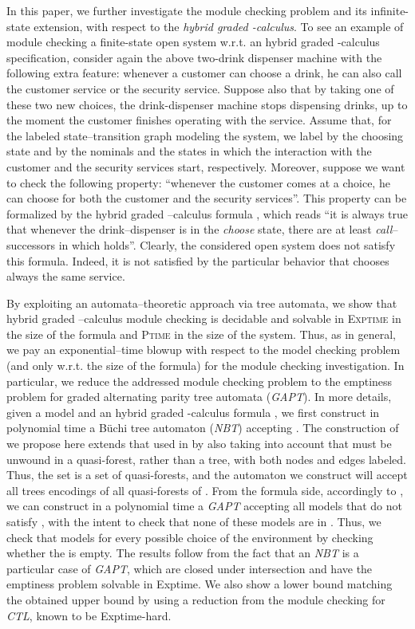 \documentclass{LMCS}
\theoremstyle{plain}
\def \CTL           {\emph{CTL}\xspace}
\def \EXP           {{\sc Exptime}\xspace}
\def \EXPTIME       {\textsc{Exptime}\xspace}
\def \GAPT          {\emph{GAPT}\xspace}
\def \NBT           {\emph{NBT}\xspace}
\def \PTIME         {\textsc{Ptime}\xspace}
\begin{document}
In this paper, we further investigate the module checking problem and its
infinite-state extension, with respect to the \emph{hybrid graded
-calculus}. To see an example of module checking a finite-state open
system w.r.t. an hybrid graded -calculus specification, consider again the
above two-drink dispenser machine with the following extra feature: whenever a
customer can choose a drink, he can also call the customer service or the
security service. Suppose also that by taking one of these two new choices, the
drink-dispenser machine stops dispensing drinks, up to the moment the customer
finishes operating with the service. Assume that, for the labeled
state--transition graph modeling the system, we label by  the
choosing state and by the nominals  and  the states in which the
interaction with the customer and the security services start, respectively.
Moreover, suppose we want to check the following property: ``whenever the
customer comes at a choice, he can choose for both the customer and the
security services''. This property can be formalized by the hybrid graded
--calculus formula , which reads ``it is always true that whenever the
drink--dispenser is in the \emph{choose} state, there are at least 
\emph{call}--successors in which  holds''. Clearly, the
considered open system does not satisfy this formula. Indeed, it is not
satisfied by the particular behavior that chooses always the same service.

By exploiting an automata--theoretic approach via tree automata, we show that
hybrid graded --calculus module checking is decidable and solvable in
\EXPTIME in the size of the formula and \PTIME in the size of the system. Thus,
as in general, we pay an exponential--time blowup with respect to the model
checking problem (and only w.r.t. the size of the formula) for the module
checking investigation. In particular, we reduce the addressed module checking
problem to the emptiness problem for graded alternating parity tree automata
(\GAPT). In more details, given a model  and an hybrid graded
-calculus formula , we first construct in polynomial time a
B\"uchi tree automaton (\NBT)  accepting . The construction
of  we propose here extends that used in \cite{KVW01} by also taking
into account that  must be unwound in a quasi-forest, rather than a tree,
with both nodes and edges labeled. Thus, the set  is a set of
quasi-forests, and the automaton  we construct will accept all trees
encodings of all quasi-forests of . From the formula side,
accordingly to \cite{BLMV06}, we can construct in a polynomial time a \GAPT
 accepting all models that do not satisfy ,
with the intent to check that none of these models are in . Thus, we
check that  models  for every possible choice of the environment
by checking whether the  is
empty. The results follow from the fact that an \NBT is a particular case of
\GAPT, which are closed under intersection and have the emptiness problem
solvable in \EXP \cite{BLMV06}. We also show a lower bound matching the
obtained upper bound by using a reduction from the module checking for \CTL,
known to be \EXP-hard.
\end{document}

